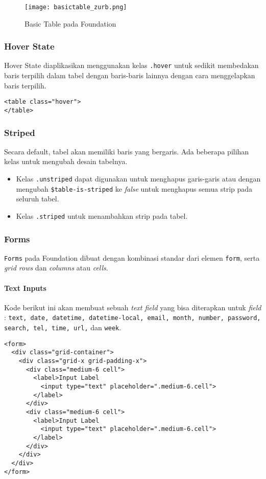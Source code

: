 \begin{figure} [H]
	\centering  
	\texttt{[image: basictable\_zurb.png]}  
	\caption{Basic Table pada Foundation}
\end{figure}

\subsubsection{Hover State}
Hover State diaplikasikan menggunakan kelas \texttt{.hover} untuk sedikit membedakan baris terpilih dalam tabel dengan baris-baris lainnya dengan cara menggelapkan baris terpilih.
\begin{lstlisting}[frame=single] 
<table class="hover">
</table>
\end{lstlisting}

\subsubsection{Striped}
Secara default, tabel akan memiliki baris yang bergaris. 
Ada beberapa pilihan kelas untuk mengubah desain tabelnya.
\begin{itemize}
	\item Kelas \texttt{.unstriped} dapat digunakan untuk menghapus garis-garis atau dengan mengubah \verb|$table-is-striped| ke \textit{false} untuk menghapus semua strip pada seluruh tabel.
	\item Kelas \texttt{.striped} untuk menambahkan strip pada tabel.	
\end{itemize}

\subsubsection{Forms}
\texttt{Forms} pada Foundation dibuat dengan kombinasi standar dari elemen \texttt{form}, serta \textit{grid rows} dan \textit{columns} atau \textit{cells}. 

\paragraph{Text Inputs}
Kode berikut ini akan membuat sebuah \textit{text field} yang bisa diterapkan untuk \textit{field} : \texttt{text, date, datetime, datetime-local, email, month, number, password, search, tel, time, url,} dan \texttt{week}.

\begin{lstlisting}[frame=single] 
<form>
  <div class="grid-container">
    <div class="grid-x grid-padding-x">
      <div class="medium-6 cell">
        <label>Input Label
          <input type="text" placeholder=".medium-6.cell">
        </label>
      </div>
      <div class="medium-6 cell">
        <label>Input Label
          <input type="text" placeholder=".medium-6.cell">
        </label>
      </div>
    </div>
  </div>
</form>
\end{lstlisting}

